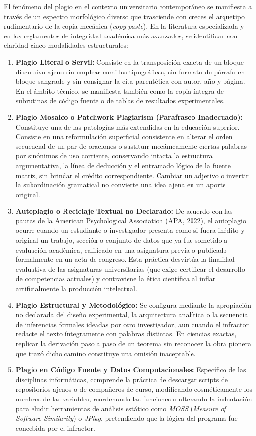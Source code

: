 El fenómeno del plagio en el contexto universitario contemporáneo se manifiesta a través de un espectro morfológico diverso que trasciende con creces el arquetipo rudimentario de la copia mecánica (\textit{copy-paste}). En la literatura especializada y en los reglamentos de integridad académica más avanzados, se identifican con claridad cinco modalidades estructurales:

\begin{enumerate}
    \item \textbf{Plagio Literal o Servil:} Consiste en la transposición exacta de un bloque discursivo ajeno sin emplear comillas tipográficas, sin formato de párrafo en bloque sangrado y sin consignar la cita parentética con autor, año y página. En el ámbito técnico, se manifiesta también como la copia íntegra de subrutinas de código fuente o de tablas de resultados experimentales.
    \item \textbf{Plagio Mosaico o Patchwork Plagiarism (Parafraseo Inadecuado):} Constituye una de las patologías más extendidas en la educación superior. Consiste en una reformulación superficial consistente en alterar el orden secuencial de un par de oraciones o sustituir mecánicamente ciertas palabras por sinónimos de uso corriente, conservando intacta la estructura argumentativa, la línea de deducción y el entramado lógico de la fuente matriz, sin brindar el crédito correspondiente. Cambiar un adjetivo o invertir la subordinación gramatical no convierte una idea ajena en un aporte original.
    \item \textbf{Autoplagio o Reciclaje Textual no Declarado:} De acuerdo con las pautas de la American Psychological Association (APA, 2022), el autoplagio ocurre cuando un estudiante o investigador presenta como si fuera inédito y original un trabajo, sección o conjunto de datos que ya fue sometido a evaluación académica, calificado en una asignatura previa o publicado formalmente en un acta de congreso. Esta práctica desvirtúa la finalidad evaluativa de las asignaturas universitarias (que exige certificar el desarrollo de competencias actuales) y contraviene la ética científica al inflar artificialmente la producción intelectual.
    \item \textbf{Plagio Estructural y Metodológico:} Se configura mediante la apropiación no declarada del diseño experimental, la arquitectura analítica o la secuencia de inferencias formales ideadas por otro investigador, aun cuando el infractor redacte el texto íntegramente con palabras distintas. En ciencias exactas, replicar la derivación paso a paso de un teorema sin reconocer la obra pionera que trazó dicho camino constituye una omisión inaceptable.
    \item \textbf{Plagio en Código Fuente y Datos Computacionales:} Específico de las disciplinas informáticas, comprende la práctica de descargar scripts de repositorios ajenos o de compañeros de curso, modificando cosméticamente los nombres de las variables, reordenando las funciones o alterando la indentación para eludir herramientas de análisis estático como \textit{MOSS} (\textit{Measure of Software Similarity}) o \textit{JPlag}, pretendiendo que la lógica del programa fue concebida por el infractor.
\end{enumerate}

